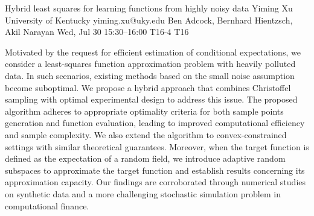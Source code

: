 \begin{talk}
  {Hybrid least squares for learning functions from highly noisy data}%
  {Yiming Xu}%
  {University of Kentucky}%
  {yiming.xu@uky.edu}%
  {Ben Adcock, Bernhard Hientzsch, Akil Narayan}%
  {}%
  {Wed, Jul 30 15:30--16:00}%
  {T16-4}%
  {T16}%
  
    
   
Motivated by the request for efficient estimation of conditional expectations, we consider a least-squares function approximation problem with heavily polluted data. In such scenarios, existing methods based on the small noise assumption become suboptimal. We propose a hybrid approach that combines Christoffel sampling with optimal experimental design to address this issue. The proposed algorithm adheres to appropriate optimality criteria for both sample points generation and function evaluation, leading to improved computational efficiency and sample complexity. We also extend the algorithm to convex-constrained settings with similar theoretical guarantees. Moreover, when the target function is defined as the expectation of a random field, we introduce adaptive random subspaces to approximate the target function and establish results concerning its approximation capacity. Our findings are corroborated through numerical studies on synthetic data and a more challenging stochastic simulation problem in computational finance.
\medskip

\end{talk}
